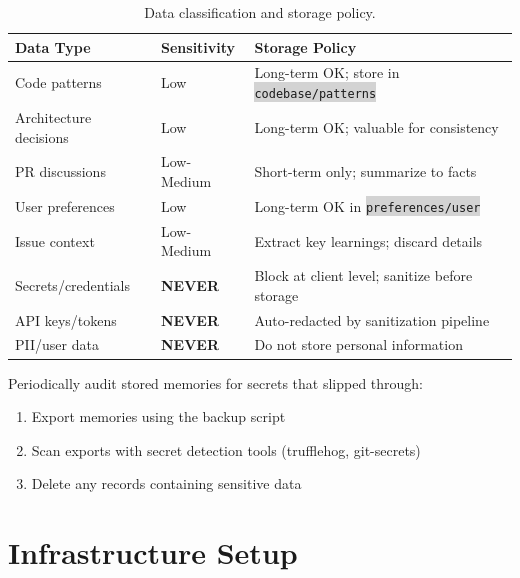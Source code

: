 \documentclass[11pt,letterpaper]{article}
\renewcommand{\arraystretch}{1.4}
\newcommand{\code}[1]{\texttt{\small\colorbox{lightgray}{#1}}}
\begin{document}
\begin{table}[!htbp]
\centering
\caption{Data classification and storage policy.}\label{tab:classification}
\renewcommand{\arraystretch}{1.5}
\begin{tabular}{L{3.5cm} >{\centering\arraybackslash}p{2.5cm} L{6.5cm}}
\textbf{\color{awsblue}Data Type} & \textbf{\color{awsblue}Sensitivity} & \textbf{\color{awsblue}Storage Policy} \\
\midrule
{}
Code patterns & Low & Long-term OK; store in \code{codebase/patterns} \\
Architecture decisions & Low & Long-term OK; valuable for consistency \\
PR discussions & Low-Medium & Short-term only; summarize to facts \\
User preferences & Low & Long-term OK in \code{preferences/user} \\
Issue context & Low-Medium & Extract key learnings; discard details \\
Secrets/credentials & \textcolor{dangerred}{\textbf{NEVER}} & Block at client level; sanitize before storage \\
API keys/tokens & \textcolor{dangerred}{\textbf{NEVER}} & Auto-redacted by sanitization pipeline \\
PII/user data & \textcolor{dangerred}{\textbf{NEVER}} & Do not store personal information \\
\bottomrule
\end{tabular}
\end{table}

\begin{warnbox}
Periodically audit stored memories for secrets that slipped through:
\begin{enumerate}
  \item Export memories using the backup script
  \item Scan exports with secret detection tools (trufflehog, git-secrets)
  \item Delete any records containing sensitive data
\end{enumerate}
\end{warnbox}

\section{Infrastructure Setup}
\end{document}
